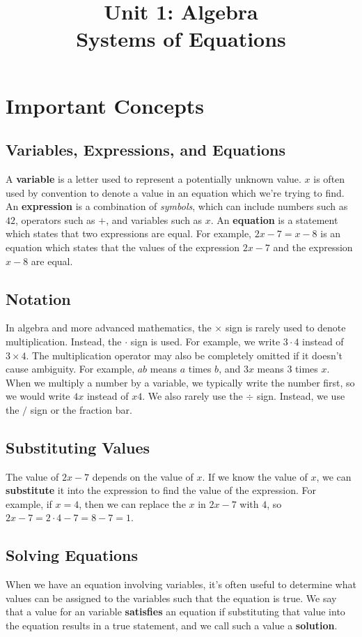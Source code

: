 \documentclass{article}
\title{Unit 1: Algebra \\ Systems of Equations}
\author{}
\date{}
\begin{document}
    \maketitle
    \section*{Important Concepts}
    \subsection*{Variables, Expressions, and Equations}
    A \textbf{variable} is a letter used to represent a potentially unknown
    value. $x$ is often used by convention to denote a value in an equation
    which we're trying to find. An \textbf{expression} is a combination of
    \emph{symbols}, which can include numbers such as $42$, operators such as
    $+$, and variables such as $x$. An \textbf{equation} is a statement which
    states that two expressions are equal. For example, $2x - 7 = x - 8$ is an
    equation which states that the values of the expression $2x - 7$ and the
    expression $x - 8$ are equal.
    \subsection*{Notation}
    In algebra and more advanced mathematics, the $\times$ sign is rarely used
    to denote multiplication. Instead, the $\cdot$ sign is used. For example, we
    write $3 \cdot 4$ instead of $3 \times 4$. The multiplication operator may
    also be completely omitted if it doesn't cause ambiguity. For example, $ab$
    means $a$ times $b$, and $3x$ means $3$ times $x$. When we multiply a number
    by a variable, we typically write the number first, so we would write $4x$
    instead of $x4$. We also rarely use the $\div$ sign. Instead, we use the $/$
    sign or the fraction bar.
    \subsection*{Substituting Values}
    The value of $2x - 7$ depends on the value of $x$. If we know the value of
    $x$, we can \textbf{substitute} it into the expression to find the value of
    the expression. For example, if $x = 4$, then we can replace the $x$ in $2x
    - 7$ with $4$, so $2x - 7 = 2 \cdot 4 - 7 = 8 - 7 = 1$.
    \subsection*{Solving Equations}
    When we have an equation involving variables, it's often useful to determine
    what values can be assigned to the variables such that the equation is true.
    We say that a value for an variable \textbf{satisfies} an equation if
    substituting that value into the equation results in a true statement, and
    we call such a value a \textbf{solution}.
\end{document}

